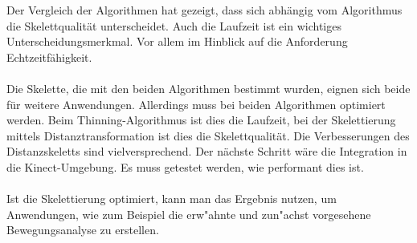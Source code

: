 Der Vergleich der Algorithmen hat gezeigt, dass sich abhängig vom Algorithmus die Skelettqualität unterscheidet. Auch die 
Laufzeit ist ein wichtiges Unterscheidungsmerkmal. Vor allem im Hinblick auf die Anforderung Echtzeitfähigkeit.\\\\
Die Skelette, die mit den beiden Algorithmen bestimmt wurden, eignen sich beide für weitere Anwendungen. Allerdings muss bei beiden Algorithmen optimiert werden. Beim Thinning-Algorithmus ist dies die Laufzeit, bei der Skelettierung mittels Distanztransformation ist dies die Skelettqualität. Die Verbesserungen des Distanzskeletts sind vielversprechend. Der nächste Schritt wäre die Integration in die Kinect-Umgebung. Es muss
getestet werden, wie performant dies ist. \\\\ Ist die Skelettierung optimiert, kann man das Ergebnis nutzen, um Anwendungen, wie zum Beispiel die erw"ahnte und zun"achst vorgesehene Bewegungsanalyse zu erstellen.